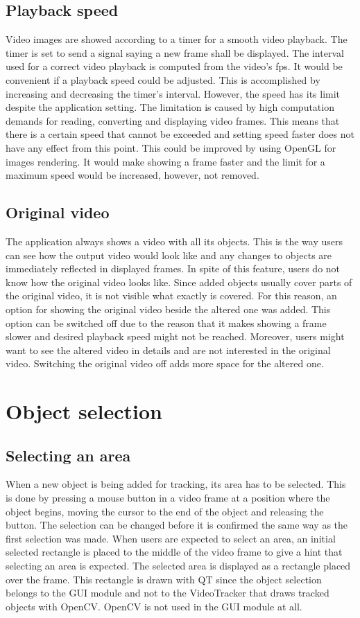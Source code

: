 \subsection{Playback speed}\label{subs:timer}
Video images are showed according to a timer for a smooth video playback. The timer is set to send a signal saying a new frame shall be displayed. The interval used for a correct video playback is computed from the video's fps. It would be convenient if a playback speed could be adjusted. This is accomplished by increasing and decreasing the timer's interval. However, the speed has its limit despite the application setting. The limitation is caused by high computation demands for reading, converting and displaying video frames. This means that there is a certain speed that cannot be exceeded and setting speed faster does not have any effect from this point. This could be improved by using OpenGL for images rendering. It would make showing a frame faster and the limit for a maximum speed would be increased, however, not removed.

\subsection{Original video}\label{subs:original_video}
The application always shows a video with all its objects. This is the way users can see how the output video would look like and any changes to objects are immediately reflected in displayed frames. In spite of this feature, users do not know how the original video looks like. Since added objects usually cover parts of the original video, it is not visible what exactly is covered. For this reason, an option for showing the original video beside the altered one was added. This option can be switched off due to the reason that it makes showing a frame slower and desired playback speed might not be reached. Moreover, users might want to see the altered video in details and are not interested in the original video. Switching the original video off adds more space for the altered one.

\section{Object selection}\label{sec:selection}
\subsection{Selecting an area}
When a new object is being added for tracking, its area has to be selected. This is done by pressing a mouse button in a video frame at a position where the object begins, moving the cursor to the end of the object and releasing the button. The selection can be changed before it is confirmed the same way as the first selection was made. When users are expected to select an area, an initial selected rectangle is placed to the middle of the video frame to give a hint that selecting an area is expected. The selected area is displayed as a rectangle placed over the frame. This rectangle is drawn with QT since the object selection belongs to the GUI module and not to the VideoTracker that draws tracked objects with OpenCV. OpenCV is not used in the GUI module at all. 

